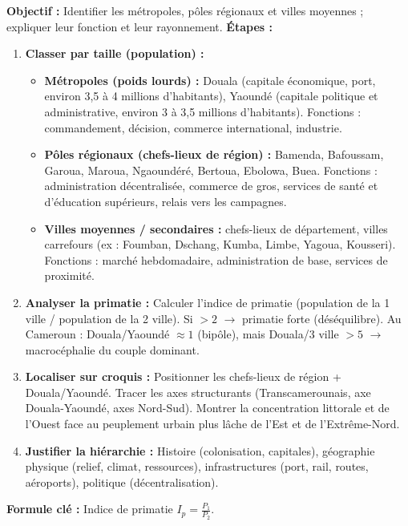\documentclass[11pt]{article}
\begin{document}
\begin{methode}
\textbf{Objectif :} Identifier les métropoles, pôles régionaux et villes moyennes ; expliquer leur fonction et leur rayonnement.
\textbf{Étapes :}
\begin{enumerate}
    \item \textbf{Classer par taille (population) :}
    \begin{itemize}
        \item \textbf{Métropoles (poids lourds) :} Douala (capitale économique, port, environ 3,5 à 4 millions d'habitants), Yaoundé (capitale politique et administrative, environ 3 à 3,5 millions d'habitants). Fonctions : commandement, décision, commerce international, industrie.
        \item \textbf{Pôles régionaux (chefs-lieux de région) :} Bamenda, Bafoussam, Garoua, Maroua, Ngaoundéré, Bertoua, Ebolowa, Buea. Fonctions : administration décentralisée, commerce de gros, services de santé et d'éducation supérieurs, relais vers les campagnes.
        \item \textbf{Villes moyennes / secondaires :} chefs-lieux de département, villes carrefours (ex : Foumban, Dschang, Kumba, Limbe, Yagoua, Kousseri). Fonctions : marché hebdomadaire, administration de base, services de proximité.
    \end{itemize}
    \item \textbf{Analyser la primatie :} Calculer l'indice de primatie (population de la 1\iere{} ville / population de la 2\ieme{} ville). Si $> 2$ $\rightarrow$ primatie forte (déséquilibre). Au Cameroun : Douala/Yaoundé $\approx 1$ (bipôle), mais Douala/3\ieme{} ville $> 5$ $\rightarrow$ macrocéphalie du couple dominant.
    \item \textbf{Localiser sur croquis :} Positionner les chefs-lieux de région + Douala/Yaoundé. Tracer les axes structurants (Transcamerounais, axe Douala-Yaoundé, axes Nord-Sud). Montrer la concentration littorale et de l'Ouest face au peuplement urbain plus lâche de l'Est et de l'Extrême-Nord.
    \item \textbf{Justifier la hiérarchie :} Histoire (colonisation, capitales), géographie physique (relief, climat, ressources), infrastructures (port, rail, routes, aéroports), politique (décentralisation).
\end{enumerate}
\textbf{Formule clé :} Indice de primatie $I_p = \frac{P_1}{P_2}$.
\end{methode}
\end{document}
